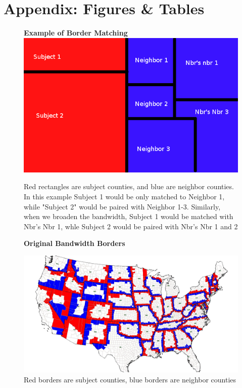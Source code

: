 \documentclass[12pt,a4paper]{article}
\begin{document}
\section{Appendix: Figures \& Tables}

\begin{figure}[h]\label{rb}
    \centering
    \textbf{Example of Border Matching}
    \includegraphics[scale = 0.5]{../analysis/output/borders_temp.png}
    \caption{Red rectangles are subject counties, and blue are neighbor counties. In this example Subject 1 would be only matched to Neighbor 1, while "Subject 2" would be paired with Neighbor 1-3. Similarly, when we broaden the bandwidth, Subject 1 would be matched with Nbr's Nbr 1, whle Subject 2 would be paired with Nbr's Nbr 1 and 2}
\end{figure}

\begin{figure}[h]\label{eb}
    \centering
    \textbf{Original Bandwidth Borders}\par\medskip
    \includegraphics[scale = 0.20]{../analysis/output/rb_picture.png}
    \caption{Red borders are subject counties, blue borders are neighbor counties}
\end{figure}
\end{document}
